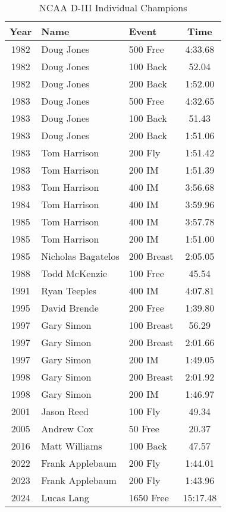 \begin{table}[htbp]
\centering
\small
\caption*{NCAA D-III Individual Champions}
\begin{tabular}{c l l c}
\toprule
Year & Name & Event & Time \\
\midrule
1982 & Doug Jones & 500 Free & 4:33.68 \\
1982 & Doug Jones & 100 Back & 52.04 \\
1982 & Doug Jones & 200 Back & 1:52.00 \\
1983 & Doug Jones & 500 Free & 4:32.65 \\
1983 & Doug Jones & 100 Back & 51.43 \\
1983 & Doug Jones & 200 Back & 1:51.06 \\
1983 & Tom Harrison & 200 Fly & 1:51.42 \\
1983 & Tom Harrison & 200 IM & 1:51.39 \\
1983 & Tom Harrison & 400 IM & 3:56.68 \\
1984 & Tom Harrison & 400 IM & 3:59.96 \\
1985 & Tom Harrison & 400 IM & 3:57.78 \\
1985 & Tom Harrison & 200 IM & 1:51.00 \\
1985 & Nicholas Bagatelos & 200 Breast & 2:05.05 \\
1988 & Todd McKenzie & 100 Free & 45.54 \\
1991 & Ryan Teeples & 400 IM & 4:07.81 \\
1995 & David Brende & 200 Free & 1:39.80 \\
1997 & Gary Simon & 100 Breast & 56.29 \\
1997 & Gary Simon & 200 Breast & 2:01.66 \\
1997 & Gary Simon & 200 IM & 1:49.05 \\
1998 & Gary Simon & 200 Breast & 2:01.92 \\
1998 & Gary Simon & 200 IM & 1:46.97 \\
2001 & Jason Reed & 100 Fly & 49.34 \\
2005 & Andrew Cox & 50 Free & 20.37 \\
2016 & Matt Williams & 100 Back & 47.57 \\
2022 & Frank Applebaum & 200 Fly & 1:44.01 \\
2023 & Frank Applebaum & 200 Fly & 1:43.96 \\
2024 & Lucas Lang & 1650 Free & 15:17.48 \\
\bottomrule
\end{tabular}
\end{table}

